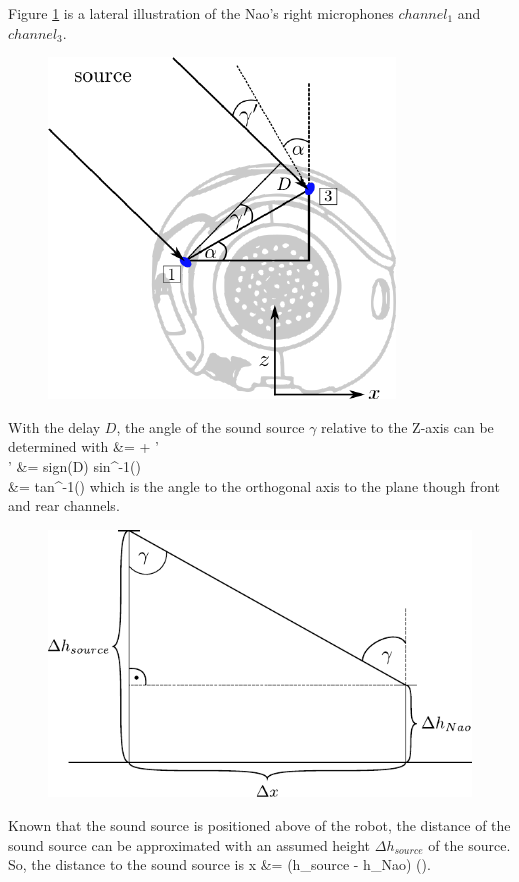 Figure \cref{fig:02_headSideTdoa} is a lateral illustration of
the Nao's right microphones $channel_1$ and $channel_3$.
\begin{figure}[ht]
	\centering
		\includegraphics[width=0.45\columnwidth]{figures/side_head_tdoa}
	\caption{}
    \label{fig:02_headSideTdoa}
\end{figure}
With the delay $D$, the angle of the sound source $\gamma$ relative
to the Z-axis can be determined with
\bsub \bal
\gamma &= \alpha + \gamma'\\
\gamma' &= sign(D) \cdot sin^{-1}()\\
\alpha &= tan^{-1}()
\eal \esub
which is the angle to the orthogonal axis to the plane though
front and rear channels.
\begin{figure}[ht]
	\centering
		\includegraphics[width=0.6\columnwidth]{figures/x_distance}
	\caption{}
    \label{fig:02_xDistance}
\end{figure}
Known that the sound source is positioned above of the robot, the distance
of the sound source can be approximated with an assumed height $\Delta h_{source}$
of the source.
So, the distance to the sound source is
\bal
\Delta x &= (\Delta h_{source} - \Delta h_{Nao}) \cdot \tan(\gamma).
\label{eq:02_deltaX}
\eal
